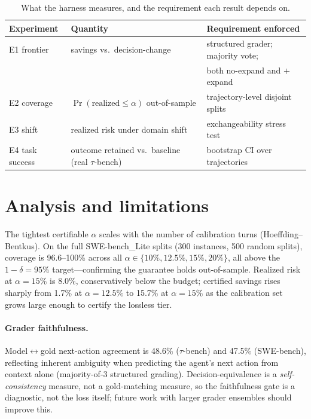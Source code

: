 \documentclass[11pt]{article}
\begin{document}
\begin{table}[t]
\centering
\caption{What the harness measures, and the requirement each result depends on.}
\begin{tabular}{@{}lll@{}}
\toprule
Experiment & Quantity & Requirement enforced \\
\midrule
E1 frontier & savings vs.\ decision-change & structured grader; majority vote; \\
            &                               & both no-expand and $+$expand \\
E2 coverage & $\Pr(\text{realized}\le\alpha)$ out-of-sample & trajectory-level disjoint splits \\
E3 shift & realized risk under domain shift & exchangeability stress test \\
E4 task success & outcome retained vs.\ baseline (real $\tau$-bench) & bootstrap CI over trajectories \\
\bottomrule
\end{tabular}
\end{table}

\section{Analysis and limitations}
\label{sec:analysis}
The tightest certifiable $\alpha$ scales with the number of calibration turns
(Hoeffding--Bentkus). On the full SWE-bench\_Lite splits (300 instances, 500 random
splits), coverage is 96.6--100\% across all $\alpha \in \{10\%, 12.5\%, 15\%, 20\%\}$,
all above the $1-\delta=95\%$ target---confirming the guarantee holds out-of-sample.
Realized risk at $\alpha=15\%$ is 8.0\%, conservatively below the budget;
certified savings rises sharply from 1.7\% at $\alpha=12.5\%$ to 15.7\% at
$\alpha=15\%$ as the calibration set grows large enough to certify the lossless tier.

\paragraph{Grader faithfulness.} Model$\leftrightarrow$gold next-action agreement is
48.6\% ($\tau$-bench) and 47.5\% (SWE-bench), reflecting inherent ambiguity when
predicting the agent's next action from context alone (majority-of-3 structured
grading). Decision-equivalence is a \emph{self-consistency} measure, not a
gold-matching measure, so the faithfulness gate is a diagnostic, not the loss
itself; future work with larger grader ensembles should improve this.
\end{document}
